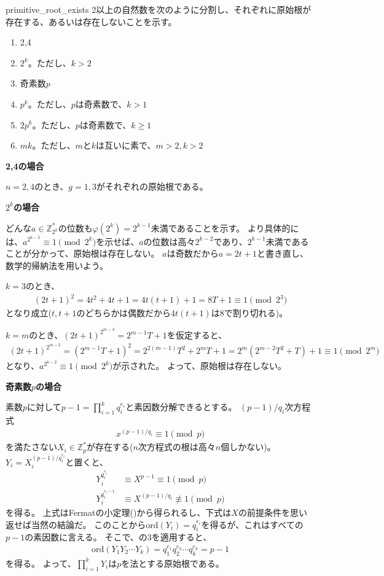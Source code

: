 \begin{prProof}{primitive_root_exists}
2以上の自然数を次のように分割し、それぞれに原始根が存在する、あるいは存在しないことを示す。
\begin{enumerate}
 \item 2,4
 \item $2^k$。ただし、$k>2$
 \item 奇素数$p$
 \item $p^k$。ただし、$p$は奇素数で、$k>1$
 \item $2p^k$。ただし、$p$は奇素数で、$k\ge1$
 \item $mk$。ただし、$m$と$k$は互いに素で、$m>2, k>2$
\end{enumerate}

\noindent\textbf{2,4の場合}

$n=2,4$のとき、$g=1,3$がそれぞれの原始根である。

\noindent\textbf{$2^k$の場合}

どんな$a\in\mathbb{Z}_{2^k}^*$の位数も$\varphi(2^k)=2^{k-1}$未満であることを示す。
より具体的には、$a^{2^{k-2}}\equiv1\pmod{2^k}$を示せば、$a$の位数は高々$2^{k-2}$であり、$2^{k-1}$未満であることが分かって、原始根は存在しない。
$a$は奇数だから$a=2t+1$と書き直し、数学的帰納法を用いよう。

$k=3$のとき、
\begin{align*}
(2t + 1)^2 = 4t^2 + 4t + 1 = 4t(t+1) + 1 = 8T + 1 \equiv 1 \pmod{2^3}
\end{align*}
となり成立($t, t+1$のどちらかは偶数だから$4t(t+1)$は8で割り切れる)。

$k=m$のとき、$(2t+1)^{2^{m-3}}=2^{m-1}T+1$を仮定すると、
\begin{align*}
(2t + 1)^{2^{m-2}} = (2^{m-1}T+1)^2 = 2^{2(m-1)}T^2 + 2^mT + 1 = 2^m(2^{m-2}T^2 + T) + 1 \equiv 1 \pmod{2^m}
\end{align*}
となり、$a^{2^{k-2}}\equiv1\pmod{2^k}$が示された。
よって、原始根は存在しない。

\noindent\textbf{奇素数$p$の場合}

素数$p$に対して$p-1=\prod_{i=1}^kq_i^{e_i}$と素因数分解できるとする。
$(p-1)/q_i$次方程式
\begin{align*}
x^{(p-1)/q_i} \equiv 1 \pmod{p}
\end{align*}
を満たさない$X_i\in\mathbb{Z}_p^*$が存在する($n$次方程式の根は高々$n$個しかない)。
$Y_i=X_i^{(p-1)/q_i^{e_i}}$と置くと、
\begin{align*}
Y_i^{q_i^{e_i}} &\equiv X^{p-1} \equiv 1 \pmod{p}\\
Y_i^{q_i^{e_i-1}} &\equiv X^{(p-1)/q_i} \not\equiv 1 \pmod{p}
\end{align*}
を得る。
上式はFermatの小定理()から得られるし、下式は$X$の前提条件を思い返せば当然の結論だ。
このことから$\mbox{ord}(Y_i)=q_i^{e_i}$を得るが、これはすべての$p-1$の素因数に言える。
そこで、の3を適用すると、
\begin{align*}
\mbox{ord}(Y_1Y_2\cdots Y_k) = q_1^{e_1}q_2^{e_2} \cdots q_k^{e_k} = p-1
\end{align*}
を得る。
よって、$\prod_{i=1}^k Y_i$は$p$を法とする原始根である。


\end{prProof}
